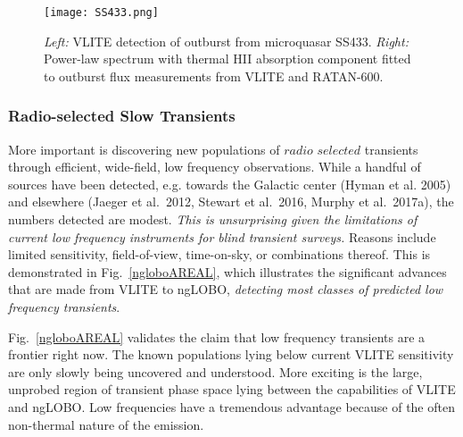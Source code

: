 \documentclass[11pt]{article}
\begin{document}
\begin{figure}[t!]
\begin{center}
\texttt{[image: SS433.png]}
\end{center}
\vspace{-0.5cm}
  \caption{
\textit{Left:} VLITE detection of outburst from microquasar SS433. \textit{Right:} Power-law spectrum with thermal HII absorption component fitted to outburst flux measurements from VLITE and RATAN-600. 
}
\label{SS433}
\end{figure}

\subsubsection{Radio-selected Slow Transients}

More important is discovering new populations of $\textit {radio selected}$ transients through efficient, wide-field, low frequency observations. While a handful of sources have been detected, e.g. towards the Galactic center (Hyman et al. 2005) and elsewhere (Jaeger et al.\ 2012, Stewart et al.\ 2016, Murphy et al.\ 2017a), the numbers detected are modest. \textit{This is unsurprising given the limitations of current low frequency instruments for blind transient surveys.} Reasons include limited sensitivity, field-of-view, time-on-sky, or combinations thereof. This is demonstrated in Fig.~\ref{ngloboAREAL}, which illustrates the significant advances that are made from VLITE 
to ngLOBO, {\it detecting most classes of predicted low frequency transients}.

Fig.~\ref{ngloboAREAL} validates the claim that low frequency transients are a frontier right now. The known populations lying below current VLITE sensitivity are only slowly being uncovered and understood.  More exciting is the large, unprobed region of transient phase space lying between the capabilities of VLITE and ngLOBO. Low frequencies have a tremendous advantage because of the often non-thermal nature of the emission. 
\end{document}
